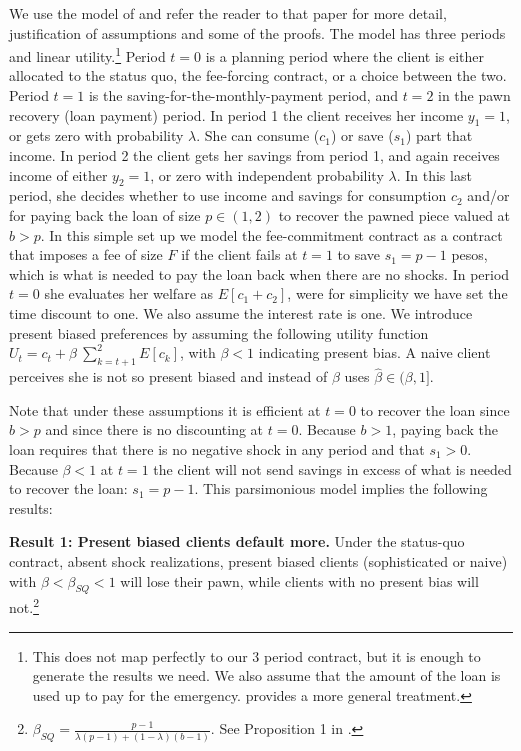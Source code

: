 \documentclass[oneside,11pt]{article}
\begin{document}
We use the model of \cite{John} and refer the reader to that paper for more detail, justification of assumptions and some of the proofs. The model has three periods and linear utility.\footnote{This does not map perfectly to our 3 period contract, but it is enough to generate the results we need. We also assume that the amount of the loan is used up to pay for the emergency. \cite{John_theory} provides a more general treatment.} Period $t=0$ is a planning period where the client is either allocated to the status quo, the fee-forcing contract, or a choice between the two. Period $t=1$ is the saving-for-the-monthly-payment  period, and $t=2$ in the pawn recovery (loan payment) period. In period 1 the client receives her income $y_1=1$, or gets zero with probability $\lambda$. She can consume ($c_1$) or save ($s_1$) part that income. In period 2 the client gets her savings from period 1, and again receives income of either $y_2=1$, or zero with independent probability $\lambda$. In this last period, she decides whether to use income and savings for consumption $c_2$ and/or for paying back the loan of size $p \in(1,2)$ to recover the pawned piece valued at $b>p$. In this simple set up we model the fee-commitment contract as a contract that imposes a fee of size $F$ if the client fails at $t=1$ to save $s_1=p-1$ pesos, which is what is needed to pay the loan back when there are no shocks. In period $t=0$ she evaluates her welfare as $E[c_1+c_2]$, were for simplicity we have set the time discount to one. We also assume the interest rate is one. We introduce present biased preferences by assuming the following utility function $U_t=c_t+\beta \: \sum_{k=t+1}^{2} E[c_k]$, with $\beta<1$ indicating present bias. A naive client perceives she is not so present biased and instead of $\beta$ uses $\hat{\beta} \in (\beta,1]$. 

Note that under these assumptions it is efficient at $t=0$ to recover the loan since $b>p$ and since there is no discounting at $t=0$. Because $b>1$, paying back the loan requires that there is no negative shock in any period and that $s_1>0$. Because $\beta<1$ at $t=1$ the client will not send savings in excess of what is needed to recover the loan: $s_1=p-1$. This parsimonious model implies the following results:

\vspace{.2in}
\noindent \textbf{Result 1: Present biased clients default more.} Under the status-quo contract, absent shock realizations, present biased clients (sophisticated or naive) with $\beta<\beta_{SQ}<1$ will lose their pawn, while clients with no present bias will not.\footnote{$\beta_{SQ}=\frac{p-1}{\lambda(p-1)+(1-\lambda)(b-1)}$. See Proposition 1 in \cite{John}.} 
\end{document}

